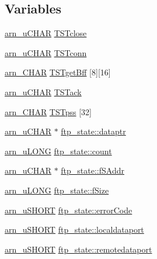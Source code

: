 \subsection*{Variables}
\begin{DoxyCompactItemize}
\item 
\hyperlink{group__ftp_ga748121386e994966f8a87f4160f055b4}{arn\_\-uCHAR} \hyperlink{group__ftp_gaeaad4e8dd2932fd22eafc9f7a72aef13}{TSTclose}
\item 
\hyperlink{group__ftp_ga748121386e994966f8a87f4160f055b4}{arn\_\-uCHAR} \hyperlink{group__ftp_ga5bd0454c64c2b49ff7cf27c99cecfb20}{TSTconn}
\item 
\hyperlink{group__ftp_gab7c92ee10c15b851350edb8a4a3bb708}{arn\_\-CHAR} \hyperlink{group__ftp_ga0e7de78898fdbc58c399ac2d2393477c}{TSTgetBff} \mbox{[}8\mbox{]}\mbox{[}16\mbox{]}
\item 
\hyperlink{group__ftp_ga748121386e994966f8a87f4160f055b4}{arn\_\-uCHAR} \hyperlink{group__ftp_ga2883c4fc99d30339045c0b359ca0edf1}{TSTack}
\item 
\hyperlink{group__ftp_gab7c92ee10c15b851350edb8a4a3bb708}{arn\_\-CHAR} \hyperlink{group__ftp_ga9d42b63fb0cdaa1f62de8ede515a5b71}{TSTpss} \mbox{[}32\mbox{]}
\item 
\hyperlink{group__ftp_ga748121386e994966f8a87f4160f055b4}{arn\_\-uCHAR} $\ast$ \hyperlink{group__ftp_gaafd205f52235c549ebeda2c92d60c17d}{ftp\_\-state::dataptr}
\item 
\hyperlink{group__ftp_ga8b49fa3351457a2ef5c6f2b84c227953}{arn\_\-uLONG} \hyperlink{group__ftp_ga705b43b8713c16ed6c2375f7cbb88f21}{ftp\_\-state::count}
\item 
\hyperlink{group__ftp_ga748121386e994966f8a87f4160f055b4}{arn\_\-uCHAR} $\ast$ \hyperlink{group__ftp_gac0c7f95f2f266647b5977451d83be1e3}{ftp\_\-state::fSAddr}
\item 
\hyperlink{group__ftp_ga8b49fa3351457a2ef5c6f2b84c227953}{arn\_\-uLONG} \hyperlink{group__ftp_ga7f29a23ccdd3a4c3ba2208d6392eb452}{ftp\_\-state::fSize}
\item 
\hyperlink{group__ftp_gaa290e3b930f0eff7f256b787fdbe02dc}{arn\_\-uSHORT} \hyperlink{group__ftp_gab56dd9f99723858913198075ba43c2aa}{ftp\_\-state::errorCode}
\item 
\hyperlink{group__ftp_gaa290e3b930f0eff7f256b787fdbe02dc}{arn\_\-uSHORT} \hyperlink{group__ftp_ga66a09edc48c8850976a82d1cbe55a54b}{ftp\_\-state::localdataport}
\item 
\hyperlink{group__ftp_gaa290e3b930f0eff7f256b787fdbe02dc}{arn\_\-uSHORT} \hyperlink{group__ftp_ga0aead28a817643dacb4df95807ab8ddf}{ftp\_\-state::remotedataport}

\end{DoxyCompactItemize}
